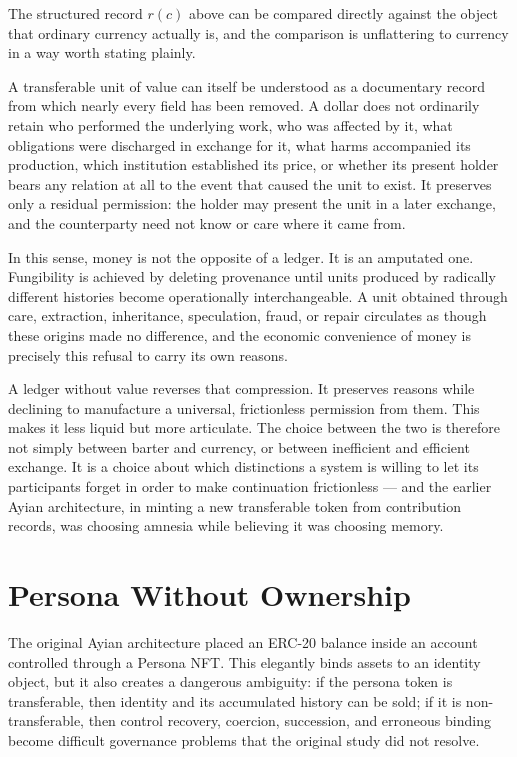 \documentclass[11pt,oneside]{article}
\theoremstyle{plain}
\theoremstyle{definition}
\begin{document}
The structured record $r(c)$ above can be compared directly against the object that ordinary currency actually is, and the comparison is unflattering to currency in a way worth stating plainly.

A transferable unit of value can itself be understood as a documentary record from which nearly every field has been removed. A dollar does not ordinarily retain who performed the underlying work, who was affected by it, what obligations were discharged in exchange for it, what harms accompanied its production, which institution established its price, or whether its present holder bears any relation at all to the event that caused the unit to exist. It preserves only a residual permission: the holder may present the unit in a later exchange, and the counterparty need not know or care where it came from.

In this sense, money is not the opposite of a ledger. It is an amputated one. Fungibility is achieved by deleting provenance until units produced by radically different histories become operationally interchangeable. A unit obtained through care, extraction, inheritance, speculation, fraud, or repair circulates as though these origins made no difference, and the economic convenience of money is precisely this refusal to carry its own reasons.

A ledger without value reverses that compression. It preserves reasons while declining to manufacture a universal, frictionless permission from them. This makes it less liquid but more articulate. The choice between the two is therefore not simply between barter and currency, or between inefficient and efficient exchange. It is a choice about which distinctions a system is willing to let its participants forget in order to make continuation frictionless --- and the earlier Ayian architecture, in minting a new transferable token from contribution records, was choosing amnesia while believing it was choosing memory.

\section{Persona Without Ownership}

The original Ayian architecture placed an ERC-20 balance inside an account controlled through a Persona NFT. This elegantly binds assets to an identity object, but it also creates a dangerous ambiguity: if the persona token is transferable, then identity and its accumulated history can be sold; if it is non-transferable, then control recovery, coercion, succession, and erroneous binding become difficult governance problems that the original study did not resolve.
\end{document}
